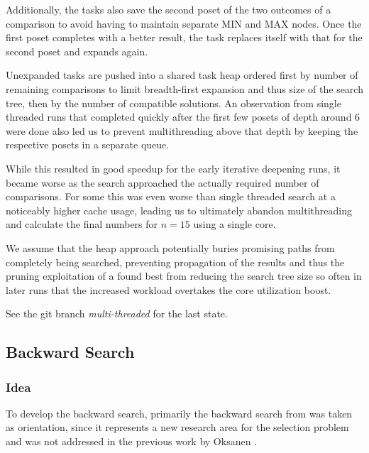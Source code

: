 \documentclass[10pt,journal,compsoc]{IEEEtran}
\begin{document}
Additionally, the tasks also save the second poset of the two outcomes of a comparison to avoid having to maintain separate
MIN and MAX nodes. Once the first poset completes with a better result, the task replaces itself with that for the second poset and expands again.

Unexpanded tasks are pushed into a shared task heap ordered first by number of remaining comparisons to limit breadth-first expansion and thus size of the search tree, then by the number of compatible solutions.
An observation from single threaded runs that completed quickly after the first few posets of depth around $6$ were done also led us to prevent multithreading above that depth by keeping the respective posets in a separate queue.

While this resulted in good speedup for the early iterative deepening runs, it became worse as the search approached the actually required number of comparisons.
For some this was even worse than single threaded search at a noticeably higher cache usage, leading us to ultimately abandon multithreading and calculate the final numbers for $n = 15$ using a single core.

We assume that the heap approach potentially buries promising paths from completely being searched, preventing propagation of the results and thus the pruning exploitation of a found best from reducing the search tree size so often in later runs that the increased workload overtakes the core utilization boost.

See the git branch \textit{multi-threaded} for the last state.

\subsection{Backward Search} \label{sec:backward}

\subsubsection{Idea}

To develop the backward search, primarily the backward search from \cite{stober2022lower} was taken as orientation, since it represents a new research area for the selection problem and was not addressed in the previous work by Oksanen \cite{Oksanen}.
\end{document}
